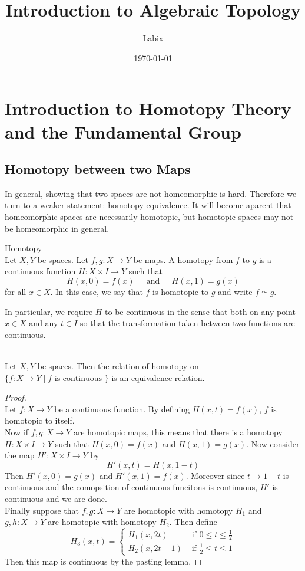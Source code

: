 \documentclass[a4paper]{article}
\title{Introduction to Algebraic Topology}
\author{Labix}
\date{\today}
\begin{document}
\maketitle

\pagebreak
\tableofcontents
\pagebreak

\section{Introduction to Homotopy Theory and the Fundamental Group}
\subsection{Homotopy between two Maps}
In general, showing that two spaces are not homeomorphic is hard. Therefore we turn to a weaker statement: homotopy equivalence. It will become aparent that homeomorphic spaces are necessarily homotopic, but homotopic spaces may not be homeomorphic in general. 

\begin{defn}{Homotopy}{}\\
Let $X,Y$ be spaces. Let $f,g:X\to Y$ be maps. A homotopy from $f$ to $g$ is a continuous function $H:X\times I\to Y$ such that $$H(x,0)=f(x)\;\;\;\;\text{ and }\;\;\;\;H(x,1)=g(x)$$ for all $x\in X$. In this case, we say that $f$ is homotopic to $g$ and write $f\simeq g$. 
\end{defn}

In particular, we require $H$ to be continuous in the sense that both on any point $x\in X$ and any $t\in I$ so that the transformation taken between two functions are continuous. 

\begin{prp}{}{}\\
Let $X,Y$ be spaces. Then the relation of homotopy on $\{f:X\to Y\;|\;f\text{ is continuous }\}$ is an equivalence relation. 
\begin{proof}\\
Let $f:X\to Y$ be a continuous function. By defining $H(x,t)=f(x)$, $f$ is homotopic to itself. \\
Now if $f,g:X\to Y$ are homotopic maps, this means that there is a homotopy $H:X\times I\to Y$ such that $H(x,0)=f(x)$ and $H(x,1)=g(x)$. Now consider the map $H':X\times I\to Y$ by $$H'(x,t)=H(x,1-t)$$ Then $H'(x,0)=g(x)$ and $H'(x,1)=f(x)$. Moreover since $t\to 1-t$ is continuous and the comopsition of continuous funcitons is continuous, $H'$ is continuous and we are done. \\
Finally suppose that $f,g:X\to Y$ are homotopic with homotopy $H_1$ and $g,h:X\to Y$ are homotopic with homotopy $H_2$. Then define $$H_3(x,t)=\begin{cases}
H_1(x,2t) & \text{ if } 0\leq t\leq\frac{1}{2}\\
H_2(x,2t-1) & \text{ if } \frac{1}{2}\leq t\leq 1
\end{cases}$$
Then this map is continuous by the pasting lemma. 
\end{proof}
\end{prp}
\end{document}
